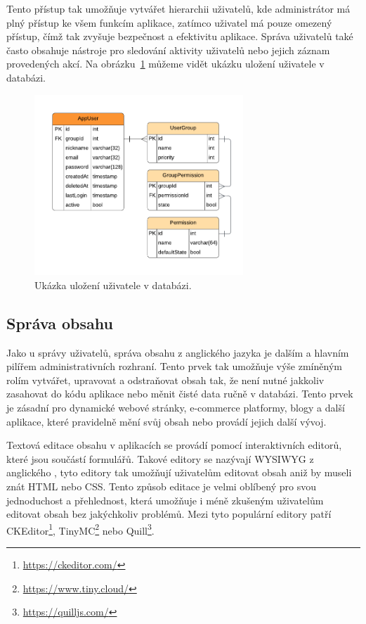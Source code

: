 Tento přístup tak umožňuje vytvářet hierarchii uživatelů, kde administrátor má plný přístup ke všem funkcím aplikace, zatímco uživatel má pouze omezený přístup, čímž tak zvyšuje bezpečnost a efektivitu aplikace. Správa uživatelů také často obsahuje nástroje pro sledování aktivity uživatelů nebo jejich záznam provedených akcí. Na obrázku~\ref{fig:user-management} můžeme vidět ukázku uložení uživatele v databázi.

\begin{figure}[H]
    \centering
    \includegraphics[width=0.7\textwidth]{diagrams/userManagement}
    \caption{Ukázka uložení uživatele v databázi. \cite{responsive_design}}
    \label{fig:user-management}
\end{figure}

\subsection{Správa obsahu}
\label{subsec:admin-elements-content-management}
Jako u správy uživatelů, správa obsahu z anglického jazyka \textit{} je dalším a hlavním pilířem administrativních rozhraní. Tento prvek tak umožňuje výše zmíněným rolím vytvářet, upravovat a odstraňovat obsah tak, že není nutné jakkoliv zasahovat do kódu aplikace nebo měnit čisté data ručně v databázi. Tento prvek je zásadní pro dynamické webové stránky, e-commerce platformy, blogy a další aplikace, které pravidelně mění svůj obsah nebo provádí jejich další vývoj.

Textová editace obsahu v aplikacích se provádí pomocí interaktivních editorů, které jsou součástí formulářů. Takové editory se nazývají WYSIWYG z anglického \textit{}, tyto editory tak umožňují uživatelům editovat obsah aniž by museli znát HTML nebo CSS. Tento způsob editace je velmi oblíbený pro svou jednoduchost a přehlednost, která umožňuje i méně zkušeným uživatelům editovat obsah bez jakýchkoliv problémů. Mezi tyto populární editory patří CKEditor\footnote[1]{\url{https://ckeditor.com/}}, TinyMC\footnote[2]{\url{https://www.tiny.cloud/}} nebo Quill\footnote[3]{\url{https://quilljs.com/}}.

